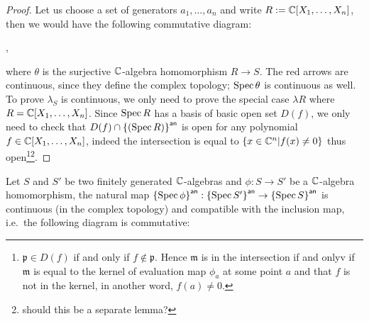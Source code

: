 \begin{proof}
  Let us choose a set of generators $a_{1},\dots, a_{n}$ and write $R := \mathbb{C}[X_{1},\dots, X_{n}]$, then we would have the following commutative diagram:

  \begin{center}
    ,
  \end{center}
  where $\theta$ is the surjective $\mathbb{C}$-algebra homomorphism $R \to S$.
  The red arrows are continuous, since they define the complex topology; $\operatorname{Spec} \theta$ is continuous as well. To prove $\lambda_{S}$ is continuous, we only need to prove the special case $\lambda R$ where $R = \mathbb{C}[X_{1},\dots, X_{n}]$. Since $\operatorname{Spec} R$ has a basis of basic open set $D(f)$, we only need to check that $D(f) \cap {\left\{{\left(\ensuremath{\operatorname{Spec}}R\right)}\right\}}^{\mathsf{an}}$ is open for any polynomial $f \in \mathbb{C}[X_{1}, \dots, X_{n}]$, indeed the intersection is equal to $\{x \in \mathbb{C}^{n}| f(x) \ne 0 \}$ thus open\footnote{$\mathfrak{p} \in D(f)$ if and only if $f \not\in \mathfrak{p}$. Hence $\mathfrak{m}$ is in the intersection if and onlyv if $\mathfrak{m}$ is equal to the kernel of evaluation map $\phi_{a}$ at some point $a$ and that $f$ is not in the kernel, in another word, $f(a) \ne 0$.}\footnote{should this be a separate lemma?}. %
\end{proof}

\begin{theorem}\label{thm:continuous-an-spec-complex-toplogy}
  Let $S$ and $S'$ be two finitely generated $\mathbb{C}$-algebras and $\phi : S \to S'$ be a $\mathbb{C}$-algebra homomorphism, the natural map ${\left\{{\operatorname{Spec}{\phi}}\right\}}^{\mathsf{an}} : {\left\{{\operatorname{Spec}{S'}}\right\}}^{\mathsf{an}} \to {\left\{{\ensuremath{\operatorname{Spec}}{S}}\right\}}^{\mathsf{an}}$ is continuous (in the complex topology)
  and compatible with the inclusion map, i.e.~the following diagram is commutative:
  \begin{center}
  \end{center}
\end{theorem}

